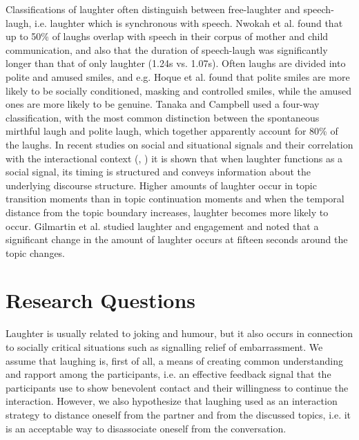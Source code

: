 \documentclass[10pt,journal,compsoc]{IEEEtran}
\begin{document}
Classifications of laughter often distinguish between free-laughter and speech-laugh, i.e. laughter which is synchronous with speech. Nwokah et al. \cite{Nwokah:ea:99} found that up to 50\% of laughs overlap with speech in their corpus of mother and child communication, and also that the duration of speech-laugh was significantly longer than that of only laughter (1.24s vs. 1.07s). Often laughs are divided into polite and amused smiles, and e.g. Hoque et al. \cite{Hoque:ea:11} found that polite smiles are more likely to be socially conditioned, masking and controlled smiles, while the amused ones are more likely to be genuine. Tanaka and Campbell \cite{Tanaka:Campbell:11} used a four-way classification, with the most common distinction between the spontaneous mirthful laugh and polite laugh, which together apparently account for 80\% of the laughs. In recent studies on social and situational signals and their correlation with the interactional context (\cite{Bonin:ea:14}, \cite{Bonin:16}) it is shown that when laughter functions as a social signal, its timing is structured and conveys information about the underlying discourse structure. Higher amounts of laughter occur in topic transition moments than in topic continuation moments and when the temporal distance from the topic boundary increases, laughter becomes more likely to occur. Gilmartin et al. \cite{Gilmartin:ea:13} studied laughter and engagement and noted that a significant change in the amount of laughter occurs at fifteen seconds around the topic changes.

\section{Research Questions}
\label{sec:research-questions}

Laughter is usually related to joking and humour, but it also occurs in connection to socially critical situations such as signalling relief of embarrassment. We assume that laughing is, first of all, a means of creating common understanding and rapport among the participants, i.e. an effective feedback signal that the participants use to show benevolent contact and their willingness to continue the interaction. However, we also hypothesize that laughing used as an interaction strategy to distance oneself from the partner and from the discussed topics, i.e. it is an acceptable way to disassociate oneself from the conversation.
\end{document}
